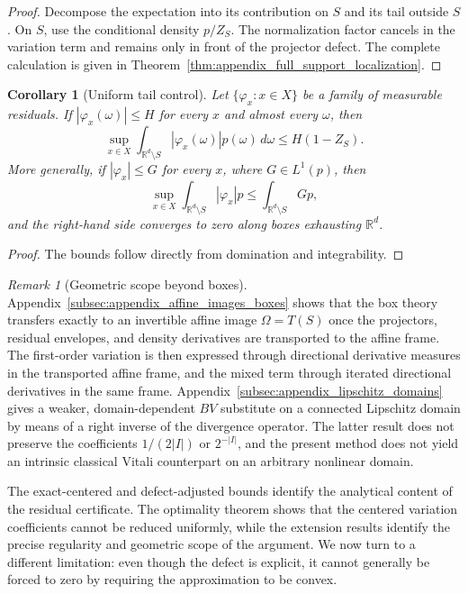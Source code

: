 \documentclass[11pt,letterpaper]{article}
\newtheorem{corollary}[theorem]{Corollary}
\theoremstyle{definition}
\theoremstyle{remark}
\newtheorem{remark}[theorem]{Remark}
\begin{document}
\begin{proof}
Decompose the expectation into its contribution on $S$ and its tail outside
$S$. On $S$, use the conditional density $p/Z_S$. The normalization factor
cancels in the variation term and remains only in front of the projector
defect. The complete calculation is given in
Theorem~\ref{thm:appendix_full_support_localization}.
\end{proof}

\begin{corollary}[Uniform tail control]
\label{cor:main_uniform_tail_control}
Let $\{\varphi_x:x\in X\}$ be a family of measurable residuals. If
$|\varphi_x(\omega)|\le H$ for every $x$ and almost every $\omega$, then
$$
\sup_{x\in X}
\int_{\mathbb R^d\setminus S}|\varphi_x(\omega)|p(\omega)\,d\omega
\le
H(1-Z_S).
$$
More generally, if $|\varphi_x|\le G$ for every $x$, where
$G\in L^1(p)$, then
$$
\sup_{x\in X}
\int_{\mathbb R^d\setminus S}|\varphi_x|p
\le
\int_{\mathbb R^d\setminus S}Gp,
$$
and the right-hand side converges to zero along boxes exhausting
$\mathbb R^d$.
\end{corollary}

\begin{proof}
The bounds follow directly from domination and integrability.
\end{proof}

\begin{remark}[Geometric scope beyond boxes]
\label{rem:main_geometric_scope_beyond_boxes}
Appendix~\ref{subsec:appendix_affine_images_boxes} shows that the box theory
transfers exactly to an invertible affine image $\Omega=T(S)$ once the
projectors, residual envelopes, and density derivatives are transported to the
affine frame. The first-order variation is then expressed through directional derivative
measures in the transported affine frame, and the mixed term through iterated
directional derivatives in the same frame. Appendix~\ref{subsec:appendix_lipschitz_domains} gives a weaker,
domain-dependent $BV$ substitute on a connected Lipschitz domain by means of a
right inverse of the divergence operator. The latter result does not preserve
the coefficients $1/(2|I|)$ or $2^{-|I|}$, and the present method does not
yield an intrinsic classical Vitali counterpart on an arbitrary nonlinear
domain.
\end{remark}

The exact-centered and defect-adjusted bounds identify the analytical content
of the residual certificate. The optimality theorem shows that the centered
variation coefficients cannot be reduced uniformly, while the extension
results identify the precise regularity and geometric scope of the argument.
We now turn to a different limitation: even though the defect is explicit, it
cannot generally be forced to zero by requiring the approximation to be
convex.
\end{document}
